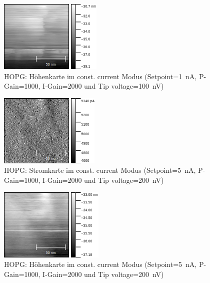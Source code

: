 \documentclass[sn-mathphys-num,iicol]{sn-jnl}
\theoremstyle{thmstyleone}
\theoremstyle{thmstyletwo}
\theoremstyle{thmstylethree}
\begin{document}
\begin{figure}[h]
        \centering
        \includegraphics[width=.5\textwidth]{../data/Graphit2_z.png}
        \caption{HOPG: Höhenkarte im const. current Modus (Setpoint=\SI{1}{\nano A}, P-Gain=\SI{1000}{}, I-Gain=\SI{2000}{} und Tip voltage=\SI{100}{\nano V})} \label{fig:gr100nm100nVz}
\end{figure}
\begin{figure}[h]
        \centering
        \includegraphics[width=.5\textwidth]{../data/Graphit3_current.png}
        \caption{HOPG: Stromkarte im const. current Modus (Setpoint=\SI{5}{\nano A}, P-Gain=\SI{1000}{}, I-Gain=\SI{2000}{} und Tip voltage=\SI{200}{\nano V})} \label{fig:gr100nm200nVc}
\end{figure}
\begin{figure}[h]
        \centering
        \includegraphics[width=.5\textwidth]{../data/Graphit3_z.png}
        \caption{HOPG: Höhenkarte im const. current Modus (Setpoint=\SI{5}{\nano A}, P-Gain=\SI{1000}{}, I-Gain=\SI{2000}{} und Tip voltage=\SI{200}{\nano V})} \label{fig:gr100nm200nVz}
\end{figure}
\end{document}
